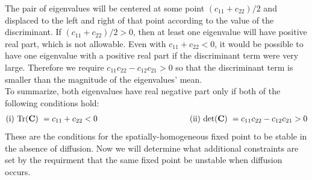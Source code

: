 \documentclass{article}
\begin{document}
The pair of eigenvalues will be centered at some point $(c_{11}+c_{22})/2$ and displaced to the left and right of that point according to the value of the discriminant. If $(c_{11}+c_{22})/2 > 0$, then at least one eigenvalue will have positive real part, which is not allowable. Even with $c_{11}+c_{22} < 0$, it would be possible to have one eigenvalue with a positive real part if the discriminant term were very large. Therefore we require $c_{11}c_{22} - c_{12} c_{21} > 0$ so that the discriminant term is smaller than the magnitude of the eigenvalues' mean.\\

To summarize, both eigenvalues have real negative part only if both of the following conditions hold:
\begin{eqnarray}
 \textrm{(i) Tr($\mathbf{C}$) }= c_{11} + c_{22} < 0 \hspace{4 cm} \textrm{(ii) det($\mathbf{C}$) }=  c_{11}c_{22} - c_{12} c_{21} > 0 \label{eqn:conditionsfromstability}
 \end{eqnarray}
These are the conditions for the spatially-homogeneous fixed point to be stable in the absence of diffusion. Now we will determine what additional constraints are set by the requirment that the same fixed point be unstable when diffusion occurs.\\
\end{document}
